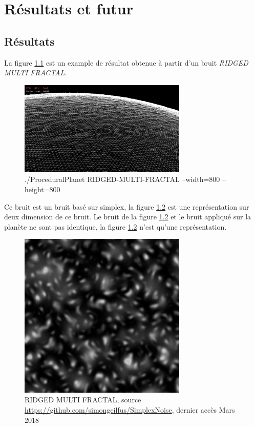 \chapter{Résultats et futur}

\section{Résultats}

La figure \ref{fig:rmf_800} est un example de résultat obtenue à partir d'un bruit \textit{RIDGED MULTI FRACTAL}. 

\begin{figure}
    \centering
    \includegraphics[width=8cm]{img/RMFV_w800_h800_wire_0.png}
    \caption{./ProceduralPlanet RIDGED-MULTI-FRACTAL --width=800 --height=800}
    \label{fig:rmf_800}
\end{figure}

Ce bruit est un bruit basé sur simplex, la figure \ref{fig:rmf} est une représentation sur deux dimension de ce bruit. 
Le bruit de la figure \ref{fig:rmf} et le bruit appliqué sur la planète ne sont pas identique, la figure \ref{fig:rmf} n'est qu'une représentation.

\begin{figure}
    \centering
    \includegraphics[width=8cm]{img/RMF.jpg}
    \caption{RIDGED MULTI FRACTAL, source \url{https://github.com/simongeilfus/SimplexNoise}, dernier accès Mars 2018}
    \label{fig:rmf}
\end{figure}



